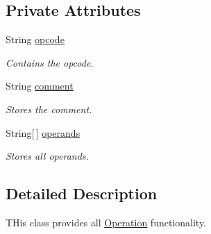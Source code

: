 \subsection*{Private Attributes}
\begin{DoxyCompactItemize}
\item 
String \hyperlink{classOperation_a91a69611ab1dd4ca12de1abdd49c2b42}{opcode}
\begin{DoxyCompactList}\small\item\em Contains the opcode. \item\end{DoxyCompactList}\item 
String \hyperlink{classOperation_a3b56588030b54deb7ffb0c5f0a4ebe68}{comment}
\begin{DoxyCompactList}\small\item\em Stores the comment. \item\end{DoxyCompactList}\item 
String\mbox{[}$\,$\mbox{]} \hyperlink{classOperation_ae5923860533d63c6a35d658b2683a994}{operands}
\begin{DoxyCompactList}\small\item\em Stores all operands. \item\end{DoxyCompactList}\end{DoxyCompactItemize}


\subsection{Detailed Description}
THis class provides all \hyperlink{classOperation}{Operation} functionality. 

